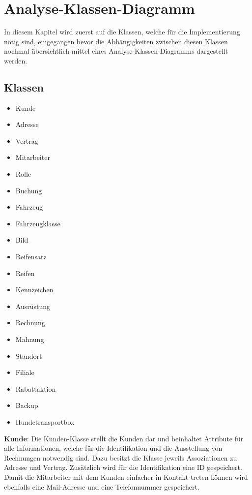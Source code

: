 \chapter{Analyse-Klassen-Diagramm}

In diesem Kapitel wird zuerst auf die Klassen, welche für die Implementierung nötig sind, eingegangen bevor die Abhängigkeiten zwischen diesen Klassen nochmal übersichtlich mittel eines Analyse-Klassen-Diagramms dargestellt werden.

\section{Klassen}
\begin{multicols}{2}
\begin{itemize}
    \item Kunde
    \item Adresse
    \item Vertrag
    \item Mitarbeiter
    \item Rolle
    \item Buchung
    \item Fahrzeug
    \item Fahrzeugklasse
    \item Bild
    \item Reifensatz
    \item Reifen
    \item Kennzeichen
    \item Ausrüstung
    \item Rechnung
    \item Mahnung
    \item Standort
    \item Filiale
    \item Rabattaktion
    \item Backup
    \item Hundetransportbox
\end{itemize}
\end{multicols}


\textbf{Kunde}: Die Kunden-Klasse stellt die Kunden dar und beinhaltet Attribute für alle Informationen, welche für die Identifikation und die Ausstellung von Rechnungen notwendig sind. Dazu besitzt die Klasse jeweils Assoziationen zu Adresse und Vertrag. Zusätzlich wird für die Identifikation eine ID gespeichert. Damit die Mitarbeiter mit dem Kunden einfacher in Kontakt treten können wird ebenfalls eine Mail-Adresse und eine Telefonnummer gespeichert. 

